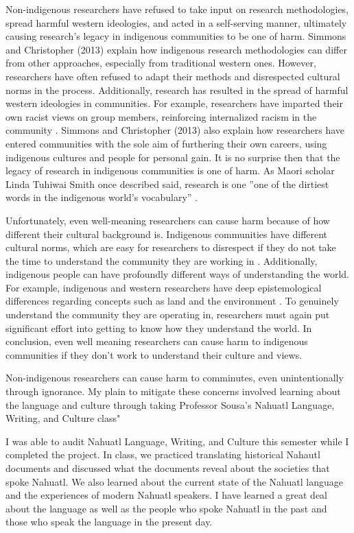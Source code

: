 \documentclass[10pt,twocolumn]{article}
\begin{document}
Non-indigenous researchers have refused to take input on research methodologies, spread harmful western ideologies, and acted in a self-serving manner, ultimately causing research’s legacy in indigenous communities to be one of harm. Simmons and Christopher (2013) \cite{AdaptingWesternMethods} explain how indigenous research methodologies can differ from other approaches, especially from traditional western ones. However, researchers have often refused to adapt their methods and disrespected cultural norms in the process. Additionally, research has resulted in the spread of harmful western ideologies in communities. For example, researchers have imparted their own racist views on group members, reinforcing internalized racism in the community \cite{TalkAboutWhatYouDontKnow}. Simmons and Christopher (2013) \cite{AdaptingWesternMethods} also explain how researchers have entered communities with the sole aim of furthering their own careers, using indigenous cultures and people for personal gain. It is no surprise then that the legacy of research in indigenous communities is one of harm. As Maori scholar Linda Tuhiwai Smith once described said, research is one ”one of the dirtiest words in the indigenous world’s
vocabulary” \cite{VingnettesAsAStrategy}.

Unfortunately, even well-meaning researchers can cause harm because of how different their cultural background is. Indigenous communities have different cultural norms, which are easy for researchers to disrespect if they do not take the time to understand the community they are working in \cite{TalkAboutWhatYouDontKnow}. Additionally, indigenous people can have profoundly different ways of understanding the world. For example, indigenous and western researchers have deep epistemological differences regarding concepts such as land and the environment \cite{TalkAboutWhatYouDontKnow}. To genuinely understand the community they are operating in, researchers must again put significant effort into getting to know how they understand the world. In conclusion, even well meaning researchers can cause harm to indigenous communities if they don’t work to understand their culture and views.

 Non-indigenous researchers can cause harm to comminutes, even unintentionally through ignorance. My plain to mitigate these concerns involved learning about the language and culture through taking  Professor Sousa's  Nahuatl Language, Writing, and Culture class"
   
I was able to audit Nahuatl Language, Writing, and Culture this semester while I completed the project. In class, we practiced translating historical Nahautl documents and discussed what the documents reveal about the societies that spoke Nahuatl. We also learned about the current state of the Nahuatl language and the experiences of modern Nahuatl speakers. I have learned a great deal about the language as well as the people who spoke Nahuatl in the past and those who speak the language in the present day.
  
\end{document}
